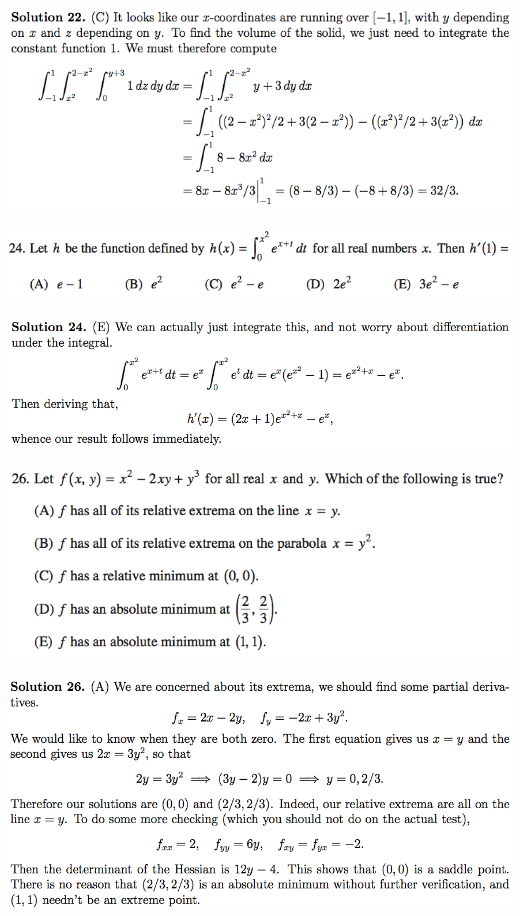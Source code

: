 \documentclass{article}
\begin{document}
\includegraphics[scale=0.65]{1268_22s}

\includegraphics[scale=0.5]{0568_24}

\includegraphics[scale=0.5]{0568_24s}

\includegraphics[scale=0.5]{0568_26}

\includegraphics[scale=0.5]{0568_26s}
\end{document}
